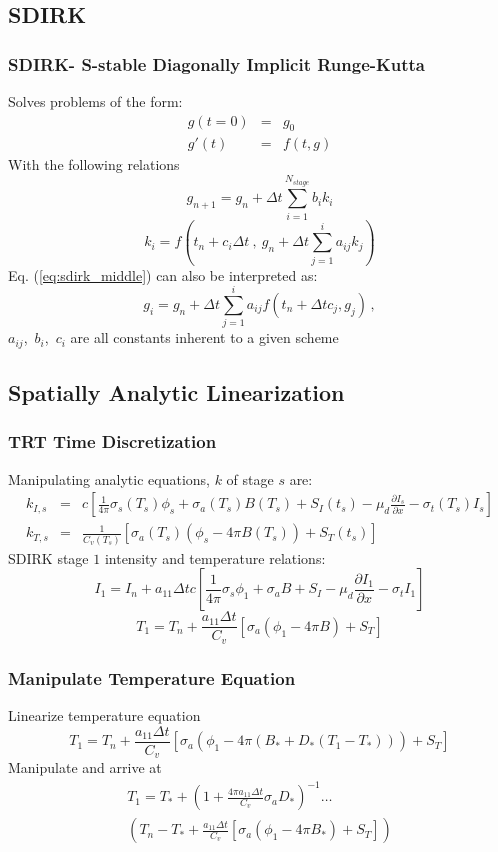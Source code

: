 \documentclass{beamer}
\newcommand{\be}{\begin{equation*}}   %
\newcommand{\ee}{\end{equation*}}
\newcommand{\benum}{\begin{equation}}   %
\newcommand{\eenum}{\end{equation}}
\newcommand{\bea}{\begin{eqnarray*}}  %
\newcommand{\eea}{\end{eqnarray*}}
\newcommand{\eqt}[1]{Eq. (\ref{#1})}  %
\newcommand{\pec}{\, ,}
\begin{document}
\subsection{SDIRK}
\begin{frame}
\frametitle{SDIRK- S-stable Diagonally Implicit Runge-Kutta}
\small
Solves problems of the form:
\bea
g(t=0) &=& g_0 \\
g'(t) &=& f(t,g)
\eea
With the following relations
\benum
g_{n+1} = g_n + \Delta t \sum_{i=1}^{N_{stage}}{b_i k_i} 
\label{eq:sdirk_middle}
\eenum
\be
k_i = f\left( t_n + c_i \Delta t ~,~g_{n} + \Delta t \sum_{j=1}^i{a_{ij} k_j }\right) 
\ee
\eqt{eq:sdirk_middle} can also be interpreted as:
\be
g_i = g_{n} + \Delta t \sum_{j=1}^i{a_{ij} f\left(t_n + \Delta t c_j , g_j\right)} \pec
\ee
$a_{ij}$,~$b_i$,~$c_{i}$ are all constants inherent to a given scheme
\end{frame}

\subsection{Spatially Analytic Linearization}
\begin{frame}
\frametitle{TRT Time Discretization}
Manipulating analytic equations, $k$ of stage $s$ are:
\bea
k_{I,s} &=& c\left[ \frac{1}{4\pi}\sigma_{s}(T_s) \phi_s + \sigma_a(T_s) B(T_s) + S_I(t_s) - \mu_d \frac{\partial I_s}{\partial x} - \sigma_t(T_s) I_s \right] \\
k_{T,s} &=& \frac{1}{C_v(T_s)} \left[ \sigma_a(T_s) \left( \phi_s - 4\pi B(T_s) \right) + S_T(t_s) \right]
\eea
SDIRK stage $1$ intensity and temperature relations:
\be
I_1 = I_n + a_{11} \Delta t c \left[ \frac{1}{4\pi}\sigma_{s} \phi_1 + \sigma_a B+ S_I - \mu_d \frac{\partial I_1}{\partial x} - \sigma_t I_1 \right] 
\ee
\be
T_1 = T_n +\frac{a_{11} \Delta t }{C_v} \left[ \sigma_a \left( \phi_1 - 4\pi B \right) + S_T  \right] 
\ee
\end{frame}

\begin{frame}
\frametitle{Manipulate Temperature Equation}
Linearize temperature equation
\be
T_1 = T_n + \frac{a_{11} \Delta t }{C_v} \left[ \sigma_a \left( \phi_1 - 4\pi \left(  B_* + D_*  \left(  T_1 - T_* \right)  \right) \right) + S_T  \right] 
\ee
Manipulate and arrive at
\begin{multline}
T_1 = T_* + \left(1 + \frac{4\pi a_{11} \Delta t}{C_v} \sigma_a D_*  \right)^{-1} \dots \\
 \left( T_n - T_* + \frac{a_{11} \Delta t }{C_v} \left[ \sigma_a \left( \phi_1 - 4\pi   B_* \right) + S_T \right]  \right)
\label{eq:temp_eq}
\end{multline}
\end{frame}
\end{document}
